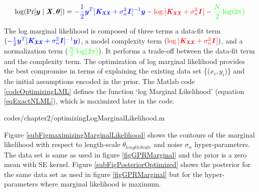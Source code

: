   \begin{equation}\label{eqExactNLML}
\log(\Pr[\boldsymbol{y} \mid \bm{\mathit{X}}, \boldsymbol{\theta}]) = \textcolor{blue}{-\frac{1}{2}\boldsymbol{y}^{T}[\bm{\mathit{K_{XX}}} + \sigma^{2}_{n}\bm{\mathit{I}}]^{-1}\boldsymbol{y}} - \textcolor{red}{\log\left |  \bm{\mathit{K_{XX}}} + \sigma^{2}_{n}\bm{\mathit{I}} \right |} - \textcolor{green}{\frac{N}{2}\log(2\pi)}
  \end{equation}

The log marginal likelihood is composed of three terms a data-fit term $( \textcolor{blue}{-\frac{1}{2}\boldsymbol{y}^{T}[\bm{\mathit{K_{XX}}} + \sigma^{2}_{n}\bm{\mathit{I}}]^{-1}\boldsymbol{y}})$, a model complexity term $( \textcolor{red}{\log\left |  \bm{\mathit{K_{XX}}} + \sigma^{2}_{n}\bm{\mathit{I}} \right |})$, and a normalization term ($\textcolor{green}{\frac{N}{2}\log(2\pi)}$). It performs a trade-off between the data-fit term and the complexity term. The optimization of log marginal likelihood provides the best compromise in terms of explaining the existing data set \{($x_{i}, y_{i}$)\} and the initial assumptions encoded in the prior. The Matlab code \ref{codeOptimizingLML} defines the function `log Marginal Likelihood' (equation \ref{eqExactNLML}), which is maximized later in the code.

\begin{mdframed}[hidealllines=true,backgroundcolor=lightgray!20]

                    {codes/chapter2/optimizingLogMarginalLikelihood.m}
\end{mdframed}

Figure \ref{subFigmaximizingMarginalLikelihood} shows the contours of the marginal likelihood with respect to length-scale $\theta_{lengthScale}$ and noise $\sigma_{n}$ hyper-parameters. The data set is same as used in figure \ref{figGPRMarginal} and the prior is a zero mean with SE kernel. Figure \ref{subFigPosteriorOptimized} shows the posterior for the same data set as used in figure \ref{figGPRMarginal} but for the hyper-parameters where marginal likelihood is maximum. 

